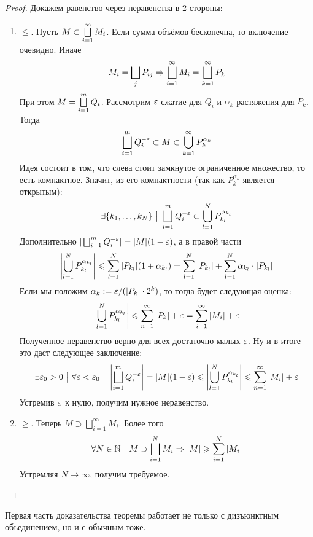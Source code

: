 \begin{proof}
	Докажем равенство через неравенства в 2 стороны:
	\begin{enumerate}
		\item $\le$. Пусть $M \subset \bigsqcup\limits_{i = 1}^\infty M_i$. Если сумма объёмов бесконечна, то включение очевидно. Иначе
		\[
			M_i = \bigsqcup\limits_j P_{ij} \Rightarrow \bigsqcup\limits_{i = 1}^\infty M_i = \bigsqcup\limits_{k = 1}^\infty P_k
		\]
		При этом $M = \bigsqcup\limits_{i = 1}^m Q_i$. Рассмотрим $\varepsilon$-сжатие для $Q_i$ и $\alpha_k$-растяжения для $P_k$. Тогда
		\[
			\bigsqcup\limits_{i = 1}^m Q_i^{-\varepsilon} \subset M \subset \bigcup\limits_{k = 1}^\infty P_k^{\alpha_k}
		\]
		Идея состоит в том, что слева стоит замкнутое ограниченное множество, то есть компактное. Значит, из его компактности (так как $P_k^{\alpha_k}$ является открытым):
		\[
			\exists \{k_1, \ldots, k_N\} \ \big|\  \bigsqcup\limits_{i = 1}^m Q_i^{-\varepsilon} \subset \bigcup\limits_{l = 1}^N P_{k_l}^{\alpha_{k_l}}
		\]
		Дополнительно $|\bigsqcup_{i = 1}^m Q_i^{-\varepsilon}| = |M|(1 - \varepsilon)$, а в правой части
		\[
			\left|\bigcup_{l = 1}^N P_{k_l}^{\alpha_{k_l}}\right| \leqslant \sum_{l = 1}^N |P_{k_l}|(1 + \alpha_{k_l}) = \sum\limits_{l = 1}^N |P_{k_l}| + \sum\limits_{l = 1}^N \alpha_{k_l} \cdot |P_{k_l}|
		\]
		Если мы положим $\alpha_k := \varepsilon / (|P_k| \cdot 2^k)$, то тогда будет следующая оценка:
		\[
			\left|\bigcup_{l = 1}^N P_{k_l}^{\alpha_{k_l}}\right| \leqslant \sum_{n = 1}^\infty |P_k| + \varepsilon = \sum\limits_{i = 1}^\infty |M_i| + \varepsilon
		\]
		Полученное неравенство верно для всех достаточно малых $\varepsilon$. Ну и в итоге это даст следующее заключение:
		\[
			\exists \varepsilon_0 > 0 \ \big|\  \forall \varepsilon < \varepsilon_0 \quad \left|\bigsqcup\limits_{i = 1}^m Q_i^{-\varepsilon}\right| = |M|(1 - \varepsilon) \leqslant \left|\bigcup_{l = 1}^N P_{k_l}^{\alpha_{k_l}}\right| \leqslant \sum_{n = 1}^\infty |M_i| + \varepsilon
		\]
		Устремив $\varepsilon$ к нулю, получим нужное неравенство.
		
		\item $\ge$. Теперь $M \supset \bigsqcup_{i = 1}^\infty M_i$. Более того
		\[
			\forall N \in \mathbb{N} \quad M \supset \bigsqcup_{i = 1}^N M_i \Rightarrow |M| \geqslant \sum\limits_{i = 1}^N |M_i|
		\]
		Устремляя $N \to \infty$, получим требуемое.
	\end{enumerate}
\end{proof}

\begin{note}
	Первая часть доказательства теоремы работает не только с дизъюнктным объединением, но и с обычным тоже.
\end{note}